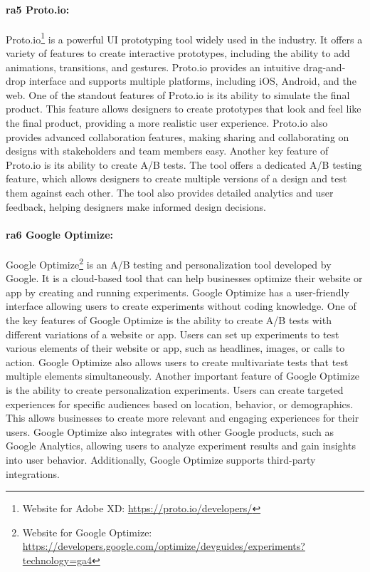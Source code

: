 \paragraph{\ac{ra}5 Proto.io:} 
Proto.io\footnote{Website for Adobe XD: \url{https://proto.io/developers/}} is a powerful UI prototyping tool widely used in the industry. 
It offers a variety of features to create interactive prototypes, including the ability to add animations, transitions, and gestures. 
Proto.io provides an intuitive drag-and-drop interface and supports multiple platforms, including iOS, Android, and the web.
One of the standout features of Proto.io is its ability to simulate the final product. 
This feature allows designers to create prototypes that look and feel like the final product, providing a more realistic user experience. 
Proto.io also provides advanced collaboration features, making sharing and collaborating on designs with stakeholders and team members easy. 
Another key feature of Proto.io is its ability to create A/B tests. The tool offers a dedicated A/B testing feature, which allows designers to create multiple versions of a design and test them against each other. 
The tool also provides detailed analytics and user feedback, helping designers make informed design decisions.

\paragraph{\ac{ra}6 Google Optimize:}
Google Optimize\footnote{Website for Google Optimize: \url{https://developers.google.com/optimize/devguides/experiments?technology=ga4}} is an A/B testing and personalization tool developed by Google. 
It is a cloud-based tool that can help businesses optimize their website or app by creating and running experiments. 
Google Optimize has a user-friendly interface allowing users to create experiments without coding knowledge. 
One of the key features of Google Optimize is the ability to create A/B tests with different variations of a website or app. 
Users can set up experiments to test various elements of their website or app, such as headlines, images, or calls to action. 
Google Optimize also allows users to create multivariate tests that test multiple elements simultaneously.
Another important feature of Google Optimize is the ability to create personalization experiments. 
Users can create targeted experiences for specific audiences based on location, behavior, or demographics. 
This allows businesses to create more relevant and engaging experiences for their users.
Google Optimize also integrates with other Google products, such as Google Analytics, allowing users to analyze experiment results and gain insights into user behavior. 
Additionally, Google Optimize supports third-party integrations.

